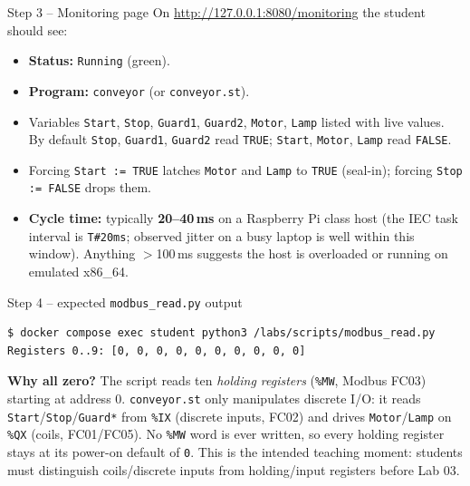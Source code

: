 \documentclass[11pt,a4paper]{article}
\begin{document}
\begin{solutionbox}{Step 3 -- Monitoring page}
On \url{http://127.0.0.1:8080/monitoring} the student should see:
\begin{itemize}[leftmargin=*, nosep]
  \item \textbf{Status:} \texttt{Running} (green).
  \item \textbf{Program:} \texttt{conveyor} (or \texttt{conveyor.st}).
  \item Variables \texttt{Start}, \texttt{Stop}, \texttt{Guard1}, \texttt{Guard2}, \texttt{Motor}, \texttt{Lamp} listed with live values. By default \texttt{Stop}, \texttt{Guard1}, \texttt{Guard2} read \texttt{TRUE}; \texttt{Start}, \texttt{Motor}, \texttt{Lamp} read \texttt{FALSE}.
  \item Forcing \texttt{Start := TRUE} latches \texttt{Motor} and \texttt{Lamp} to \texttt{TRUE} (seal-in); forcing \texttt{Stop := FALSE} drops them.
  \item \textbf{Cycle time:} typically \textbf{20--40\,ms} on a Raspberry Pi class host (the IEC task interval is \texttt{T\#20ms}; observed jitter on a busy laptop is well within this window). Anything $>$100\,ms suggests the host is overloaded or running on emulated x86\_64.
\end{itemize}
\end{solutionbox}

\begin{solutionbox}{Step 4 -- expected \texttt{modbus\_read.py} output}
\begin{lstlisting}[language=bash]
$ docker compose exec student python3 /labs/scripts/modbus_read.py
Registers 0..9: [0, 0, 0, 0, 0, 0, 0, 0, 0, 0]
\end{lstlisting}
\textbf{Why all zero?} The script reads ten \emph{holding registers} (\texttt{\%MW}, Modbus FC03) starting at address 0. \texttt{conveyor.st} only manipulates discrete I/O: it reads \texttt{Start}/\texttt{Stop}/\texttt{Guard*} from \texttt{\%IX} (discrete inputs, FC02) and drives \texttt{Motor}/\texttt{Lamp} on \texttt{\%QX} (coils, FC01/FC05). No \texttt{\%MW} word is ever written, so every holding register stays at its power-on default of \texttt{0}. This is the intended teaching moment: students must distinguish coils/discrete inputs from holding/input registers before Lab 03.
\end{solutionbox}
\end{document}
